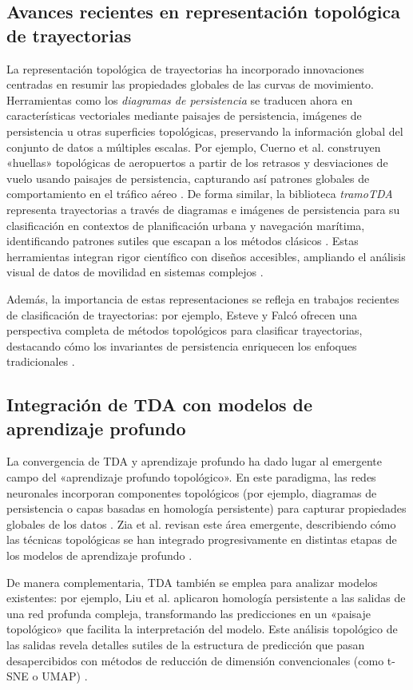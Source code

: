 \subsection{Avances recientes en representación topológica de trayectorias}
La representación topológica de trayectorias ha incorporado innovaciones centradas en resumir las propiedades globales de las curvas de movimiento. Herramientas como los \textit{diagramas de persistencia} se traducen ahora en características vectoriales mediante paisajes de persistencia, imágenes de persistencia u otras superficies topológicas, preservando la información global del conjunto de datos a múltiples escalas. Por ejemplo, Cuerno et al. construyen «huellas» topológicas de aeropuertos a partir de los retrasos y desviaciones de vuelo usando paisajes de persistencia, capturando así patrones globales de comportamiento en el tráfico aéreo \cite{Cuerno2025}. De forma similar, la biblioteca \textit{tramoTDA} representa trayectorias a través de diagramas e imágenes de persistencia para su clasificación en contextos de planificación urbana y navegación marítima, identificando patrones sutiles que escapan a los métodos clásicos \cite{EsteveFalco2024}. Estas herramientas integran rigor científico con diseños accesibles, ampliando el análisis visual de datos de movilidad en sistemas complejos \cite{EsteveFalco2024}. 

Además, la importancia de estas representaciones se refleja en trabajos recientes de clasificación de trayectorias: por ejemplo, Esteve y Falcó ofrecen una perspectiva completa de métodos topológicos para clasificar trayectorias, destacando cómo los invariantes de persistencia enriquecen los enfoques tradicionales \cite{EsteveFalco2025}. 

\subsection{Integración de TDA con modelos de aprendizaje profundo}
La convergencia de TDA y aprendizaje profundo ha dado lugar al emergente campo del «aprendizaje profundo topológico». En este paradigma, las redes neuronales incorporan componentes topológicos (por ejemplo, diagramas de persistencia o capas basadas en homología persistente) para capturar propiedades globales de los datos \cite{Zia2024}. Zia et al. revisan este área emergente, describiendo cómo las técnicas topológicas se han integrado progresivamente en distintas etapas de los modelos de aprendizaje profundo \cite{Zia2024}. 

De manera complementaria, TDA también se emplea para analizar modelos existentes: por ejemplo, Liu et al. aplicaron homología persistente a las salidas de una red profunda compleja, transformando las predicciones en un «paisaje topológico» que facilita la interpretación del modelo. Este análisis topológico de las salidas revela detalles sutiles de la estructura de predicción que pasan desapercibidos con métodos de reducción de dimensión convencionales (como t-SNE o UMAP) \cite{Liu2023}. 

